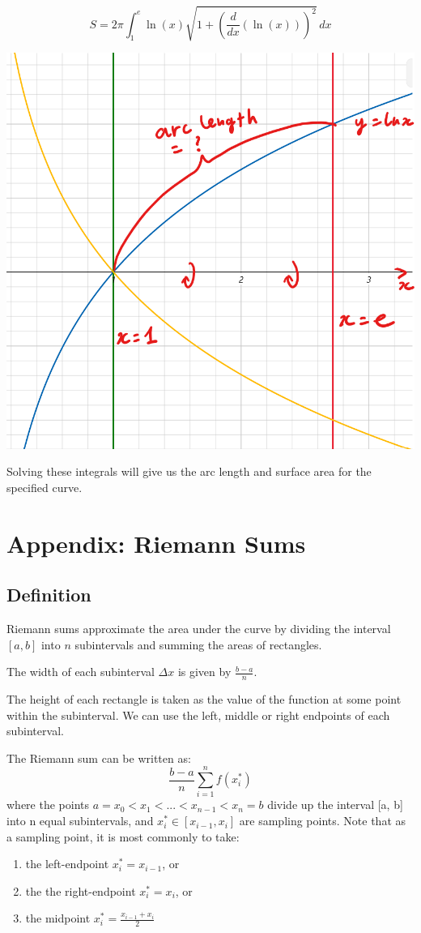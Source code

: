 \documentclass{article}
\begin{document}
\[
S = 2\pi \int_{1}^{e} \ln(x) \sqrt{1 + \left(\frac{d}{dx}(\ln(x))\right)^2} \, dx
\]

\begin{center}
    \includegraphics[scale = 0.5]{arc.png}
\end{center}
Solving these integrals will give us the arc length and surface area for the specified curve.

\section{Appendix: Riemann Sums}
\subsection{Definition}
Riemann sums approximate the area under the curve by dividing the interval $[a, b]$ into $n$ subintervals and summing the areas of rectangles.

The width of each subinterval $\Delta x$ is given by $\frac{b - a}{n}$.

The height of each rectangle is taken as the value of the function at some point within the subinterval. We can use the left, middle or right endpoints of each subinterval.

The Riemann sum can be written as:
\[ \frac{b-a}{n}\sum_{i=1}^{n} f(x_i^*) \]
where the points $a = x_0 < x_1 < ... < x_{n-1} < x_n = b$ divide up the interval [a, b] into n equal subintervals, and $x^{*}_{i} \in [x_{i-1}, x_{i}]$ are sampling points.
Note that as a sampling point, it is most commonly to take:
\begin{enumerate}
    \item the left-endpoint $x^*_i = x_{i-1}$, or
    \item the the right-endpoint $x^*_i = x_i$, or
    \item the midpoint $x^*_i = \frac{x_{i-1} + x_i}{2}$
\end{enumerate}
\end{document}
